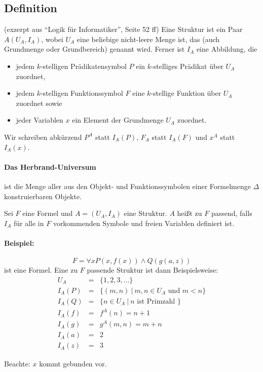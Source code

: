 \documentclass[a4paper]{scrartcl}
\begin{document}
\subsection{Definition}
(exzerpt aus ``Logik für Informatiker'', Seite 52 ff)
Eine Struktur ist ein Paar $A(U_A,I_A)$, wobei $U_A$ eine beliebige nicht-leere Menge ist, das  (auch Grundmenge oder Grundbereich) genannt wird. Ferner ist $I_A$ eine Abbildung, die
\begin{itemize}
\item jedem $k$-stelligen Prädikatensymbol $P$ ein $k$-stelliges Prädikat über $U_A$ zuordnet,
\item jedem $k$-stelligen Funktionssymbol $F$ eine $k$-stellige Funktion über $U_A$ zuordnet sowie
\item jeder Variablen $x$ ein Element der Grundmenge $U_A$ zuordnet.
\end{itemize}
Wir schreiben abkürzend $P^A$ statt $I_A(P)$, $F_A$ statt $I_A(F)$ und $x^A$ statt $I_A(x)$.

\paragraph{Das Herbrand-Universum} ist die Menge aller aus den Objekt- und Funktionssymbolen einer Formelmenge $\Delta$ konstruierbaren Objekte.

Sei $F$ eine Formel und $A=(U_A,I_A)$ eine Struktur. $A$ heißt zu $F$ passend, falls $I_A$ für alle in $F$ vorkommenden Symbole und freien Variablen definiert ist.


\paragraph{Beispiel:} $$F = \forall x P(x,f(x)) \wedge Q(g(a,z))$$ ist eine Formel. Eine zu $F$ passende Struktur ist dann Beispielsweise:
\begin{eqnarray*}
U_A &=& \{1,2,3,\ldots\} \\
I_A(P) &=& \{ (m,n)\ |\ m,n \in U_A \text{ und } m<n\} \\
I_A(Q) &=& \{ n\in U_A\ |\ n \text{ ist Primzahl }\} \\
I_A(f) &=& f^A(n) = n+1 \\
I_A(g) &=& g^A(m,n) = m+n \\
I_A(a) &=& 2 \\
I_A(z) &=& 3
\end{eqnarray*}

Beachte: $x$ kommt gebunden vor.
\end{document}
